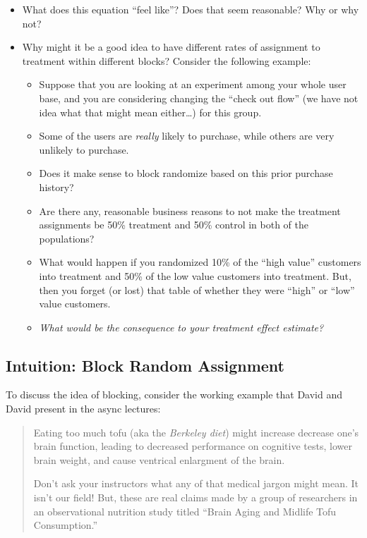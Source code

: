 \documentclass[
]{article}
\providecommand{\tightlist}{%
  \setlength{\itemsep}{0pt}\setlength{\parskip}{0pt}}
\begin{document}
\begin{itemize}
\item
  What does this equation ``feel like''? Does that seem reasonable? Why or why not?
\item
  Why might it be a good idea to have different rates of assignment to treatment within different blocks? Consider the following example:

  \begin{itemize}
  \tightlist
  \item
    Suppose that you are looking at an experiment among your whole user base, and you are considering changing the ``check out flow'' (we have not idea what that might mean either\ldots) for this group.
  \item
    Some of the users are \emph{really} likely to purchase, while others are very unlikely to purchase.
  \item
    Does it make sense to block randomize based on this prior purchase history?
  \item
    Are there any, reasonable business reasons to not make the treatment assignments be 50\% treatment and 50\% control in both of the populations?
  \item
    What would happen if you randomized 10\% of the ``high value'' customers into treatment and 50\% of the low value customers into treatment. But, then you forget (or lost) that table of whether they were ``high'' or ``low'' value customers.
  \item
    \emph{What would be the consequence to your treatment effect estimate?}
  \end{itemize}
\end{itemize}

\hypertarget{intuition-block-random-assignment}{%
\subsection{Intuition: Block Random Assignment}\label{intuition-block-random-assignment}}

To discuss the idea of blocking, consider the working example that David and David present in the async lectures:

\begin{quote}
Eating too much tofu (aka the \emph{Berkeley diet}) might increase decrease one's brain function, leading to decreased performance on cognitive tests, lower brain weight, and cause ventrical enlargment of the brain.

Don't ask your instructors what any of that medical jargon might mean. It isn't our field! But, these are real claims made by a group of researchers in an observational nutrition study titled ``Brain Aging and Midlife Tofu Consumption.''
\end{quote}
\end{document}
